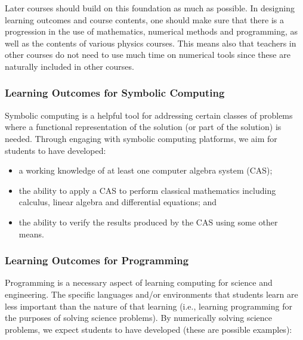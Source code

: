 \documentclass[graybox,envcountchap,sectrefs]{svmult}
\begin{document}
Later courses should build on this foundation as much as possible. In designing learning outcomes and course contents, one should make
sure that there is a progression in the use of mathematics, numerical
methods and programming, as well as the contents of various physics
courses.  This means also that teachers in other courses do not need
to use much time on numerical tools since these are naturally included
in other courses.



\subsubsection{Learning Outcomes for Symbolic Computing}
Symbolic computing  is a helpful tool for addressing certain classes of
problems where a functional representation of the solution (or part of
the solution) is needed. Through engaging with symbolic computing
platforms, we aim for students to have developed:

\begin{itemize}
\item a working knowledge of at least one computer algebra system (CAS);

\item the ability to apply a CAS to perform classical mathematics including calculus, linear algebra and differential equations; and

\item the ability to verify the results produced by the CAS using some other means.
\end{itemize}


\subsubsection{Learning Outcomes for Programming}
Programming is a necessary aspect of learning computing  for science
and engineering. The specific languages and/or environments that
students learn are less important than the nature of that learning
(i.e., learning programming for the purposes of solving science
problems). By numerically solving science problems, we expect students
to have developed (these are possible examples):
\end{document}
